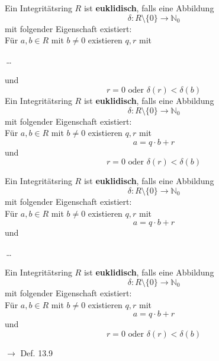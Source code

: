 \documentclass[11pt]{article}
\renewcommand{\cite}[1]{\par\bigskip\hfill{\color{gray}\tiny\(\to\) #1}}
\newcommand{\NN}{\mathbb{N}}
\let\olddots\dots
\renewcommand{\dots}{\,\olddots\,}
\newenvironment{field}{}{\newpage}
\newif\ifnote
\newenvironment{note}{\notetrue}{\notefalse}
\newcommand{\localtag}{}
\newcommand{\globaltag}{}
\newcommand{\uuid}{}
\newcommand{\tags}[1]{
    \ifnote
        \renewcommand{\localtag}{#1}
    \else
        \renewcommand{\globaltag}{#1}
    \fi
    }
\newcommand{\xplain}[1]{\renewcommand{\uuid}{#1}}
\begin{document}
\begin{note}
    \tags{Def}
    \xplain{f86a676e-ef48-4e9b-a39b-9bf39ad9c931}

    \begin{field}
        Ein Integritätsring $R$ ist \textbf{euklidisch}, falls eine Abbildung
        \[\delta: R\setminus \{0\} \longrightarrow \NN_0\]
        mit folgender Eigenschaft existiert:\\
        Für $a,b\in R$ mit $b\neq 0$ existieren $q,r$ mit        \begin{center}\dots\end{center}

        und
        \[r=0 \text{ oder } \delta(r) < \delta(b)\]
    \end{field}
    \begin{field}
        Ein Integritätsring $R$ ist \textbf{euklidisch}, falls eine Abbildung
        \[\delta: R\setminus \{0\} \longrightarrow \NN_0\]
        mit folgender Eigenschaft existiert:\\
        Für $a,b\in R$ mit $b\neq 0$ existieren $q,r$ mit
        \[ a = q\cdot b + r\]
        und
        \[r=0 \text{ oder } \delta(r) < \delta(b)\]
    \end{field}

    \begin{field}
        Ein Integritätsring $R$ ist \textbf{euklidisch}, falls eine Abbildung
        \[\delta: R\setminus \{0\} \longrightarrow \NN_0\]
        mit folgender Eigenschaft existiert:\\
        Für $a,b\in R$ mit $b\neq 0$ existieren $q,r$ mit
        \[ a = q\cdot b + r\]
        und
        \begin{center}\dots\end{center}
    \end{field}
    \begin{field}
        Ein Integritätsring $R$ ist \textbf{euklidisch}, falls eine Abbildung
        \[\delta: R\setminus \{0\} \longrightarrow \NN_0\]
        mit folgender Eigenschaft existiert:\\
        Für $a,b\in R$ mit $b\neq 0$ existieren $q,r$ mit
        \[ a = q\cdot b + r\]
        und
        \[r=0 \text{ oder } \delta(r) < \delta(b)\]
        \cite{Def. 13.9}
    \end{field}
\end{note}

\end{document}
